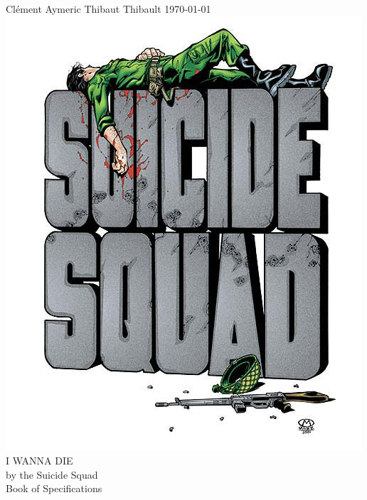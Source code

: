 
\begin{titlepage}
	Clément  Aymeric  Thibaut  Thibault  \hfill \today
	{\centering
		\vfill
		\includegraphics[scale=0.5]{logo.jpg}
		\\[1cm]
		\Huge I WANNA DIE
		\\[1cm]
		\small by the \Large Suicide Squad
		\\[1cm]
		\large Book of Specifications
		\vfill
	}
\end{titlepage}
\restoregeometry
